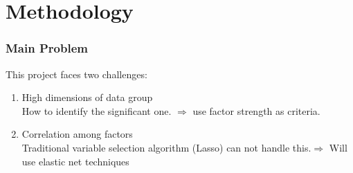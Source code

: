 \documentclass[12pt]{beamer}
\begin{document}



	\section{Methodology}

\begin{frame}
\frametitle{Main Problem}
This project faces two challenges:
\begin{enumerate}
\item	 High dimensions of data group\\
How to identify the significant one. $\Rightarrow$ \alert{use factor strength as criteria.}
\item 	Correlation among factors \\
Traditional variable selection algorithm (Lasso) can not handle this.$\Rightarrow$ Will use \alert{elastic net} techniques
\end{enumerate}
\end{frame}

	
\end{document}
